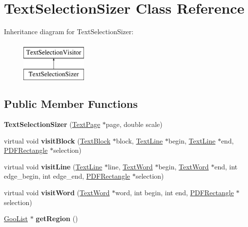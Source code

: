 \hypertarget{class_text_selection_sizer}{}\section{Text\+Selection\+Sizer Class Reference}
\label{class_text_selection_sizer}
Inheritance diagram for Text\+Selection\+Sizer\+:\begin{figure}[H]
\begin{center}
\leavevmode
\includegraphics[height=2.000000cm]{class_text_selection_sizer}
\end{center}
\end{figure}
\subsection*{Public Member Functions}
\begin{DoxyCompactItemize}
\item 
\mbox{\label{class_text_selection_sizer_a58e5505f73bc35214330f691e0e81aa5}} 
{\bfseries Text\+Selection\+Sizer} (\hyperlink{class_text_page}{Text\+Page} $\ast$page, double scale)
\item 
\mbox{\label{class_text_selection_sizer_a2a29f2a3cd38e53065d3f78f6df739e5}} 
virtual void {\bfseries visit\+Block} (\hyperlink{class_text_block}{Text\+Block} $\ast$block, \hyperlink{class_text_line}{Text\+Line} $\ast$begin, \hyperlink{class_text_line}{Text\+Line} $\ast$end, \hyperlink{class_p_d_f_rectangle}{P\+D\+F\+Rectangle} $\ast$selection)
\item 
\mbox{\label{class_text_selection_sizer_a425a9e7ad9d15259ca3a12b4b79e0f08}} 
virtual void {\bfseries visit\+Line} (\hyperlink{class_text_line}{Text\+Line} $\ast$line, \hyperlink{class_text_word}{Text\+Word} $\ast$begin, \hyperlink{class_text_word}{Text\+Word} $\ast$end, int edge\+\_\+begin, int edge\+\_\+end, \hyperlink{class_p_d_f_rectangle}{P\+D\+F\+Rectangle} $\ast$selection)
\item 
\mbox{\label{class_text_selection_sizer_aa0b30ad598e71f86a41dcbf6400351f6}} 
virtual void {\bfseries visit\+Word} (\hyperlink{class_text_word}{Text\+Word} $\ast$word, int begin, int end, \hyperlink{class_p_d_f_rectangle}{P\+D\+F\+Rectangle} $\ast$selection)
\item 
\mbox{\label{class_text_selection_sizer_ac5506a52e7676a10305e1adfae02d348}} 
\hyperlink{class_goo_list}{Goo\+List} $\ast$ {\bfseries get\+Region} ()
\end{DoxyCompactItemize}
